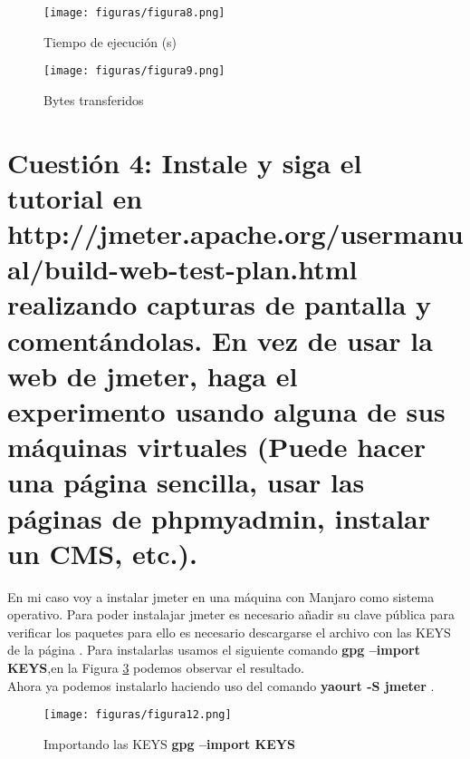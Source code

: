 \begin{figure}[H] %
	\centering
	\texttt{[image: figuras/figura8.png]}  %
	
	
	\caption{Tiempo de ejecución (s)}
	\label{figura8}
\end{figure}
\begin{figure}[H] %
	\centering
	\texttt{[image: figuras/figura9.png]}  %
	
	
	\caption{Bytes transferidos}
	\label{figura9}
\end{figure}

\section{Cuestión 4: Instale y siga el tutorial en http://jmeter.apache.org/usermanual/build-web-test-plan.html realizando capturas de pantalla y comentándolas. En vez de usar la web de jmeter, haga el experimento usando alguna de sus máquinas virtuales (Puede hacer una página sencilla, usar las páginas de phpmyadmin, instalar un CMS, etc.).}

En mi caso voy a instalar jmeter en una máquina con Manjaro como sistema operativo. Para poder instalajar jmeter es necesario añadir su clave pública para verificar los paquetes para ello es necesario descargarse el archivo con las KEYS de la página \cite{keys}. Para instalarlas usamos el siguiente comando \textbf{gpg --import KEYS},en la Figura \ref{figura12} podemos observar el resultado.\\
Ahora ya podemos instalarlo haciendo uso del comando \textbf{yaourt -S jmeter} .\\

\begin{figure}[H] %
	\centering
	\texttt{[image: figuras/figura12.png]}  %
	
	
	\caption{Importando las KEYS \textbf{gpg --import KEYS}}
	\label{figura12}
\end{figure}

